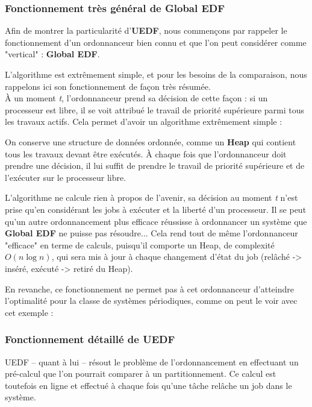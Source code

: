 		\subsubsection{Fonctionnement très général de Global EDF}
		Afin de montrer la particularité d'\textbf{UEDF}, nous commençons par rappeler le fonctionnement 
		d'un ordonnanceur bien connu et que l'on peut considérer comme "vertical" : \textbf{Global EDF}. 
		
		L'algorithme est extrêmement simple, et pour les besoins de la comparaison, nous rappelons 
		ici son fonctionnement de façon très résumée.\\
		À un moment \textit{t}, l'ordonnanceur prend sa décision de cette façon :
		si un processeur est libre, il se voit attribué le travail de priorité supérieure parmi 
		tous les travaux actifs. Cela permet d'avoir un algorithme extrêmement simple :\newline
		
		
		On conserve une structure de données 
		ordonnée, comme un \textbf{Heap}  qui contient tous les travaux
		devant être exécutés. À chaque fois que l'ordonnanceur doit prendre 
		une décision, il lui suffit de prendre le travail de priorité supérieure et 
		de l'exécuter sur le processeur libre.
		
		L'algorithme ne calcule rien à propos de l'avenir, sa décision au moment \textit{t}
		n'est prise qu'en considérant les jobs à exécuter et la liberté d'un 
		processeur. Il se peut qu'un autre ordonnancement plus efficace 
		réussisse à ordonnancer un système que \textbf{Global EDF} ne puisse pas résoudre...
		Cela rend tout de même l'ordonnanceur "efficace" en terme de calculs, 
		puisqu'il comporte un Heap, de complexité $O(n\log n)$, qui sera mis à jour 
		à chaque changement d'état du job (relâché -> inséré, 
		exécuté -> retiré du Heap).
		
		En revanche, ce fonctionnement ne permet pas à cet ordonnanceur d'atteindre 
		l'optimalité pour la classe de systèmes périodiques, comme on peut le voir 
		avec cet exemple :

		\subsubsection{Fonctionnement détaillé de UEDF}
		UEDF -- quant à lui -- résout le problème de l'ordonnancement en effectuant un pré-calcul 
		que l'on pourrait comparer à un partitionnement. Ce calcul est toutefois en ligne et 
		effectué à chaque fois qu'une tâche relâche un job dans le système.
		
